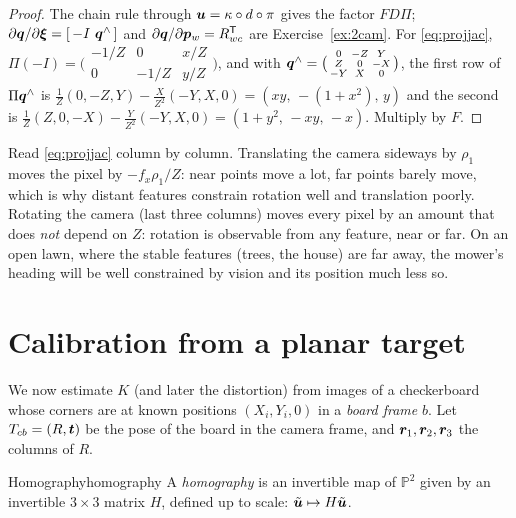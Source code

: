 \begin{proof}
The chain rule through $\bm{u}=\kappa\circ d\circ\pi$ gives the factor
$FD\Pi$; $\partial\vect{q}/\partial\bxi=[\,-I\ \hatop{\vect{q}}\,]$ and
$\partial\bm{q}/\partial\bm{p}_w=R_{wc}^{\mathsf{T}}$ are Exercise~\ref{ex:2cam}.
For \eqref{eq:projjac}, $\Pi(-I)=\bigl(\begin{smallmatrix}-1/Z&0&x/Z\\
0&-1/Z&y/Z\end{smallmatrix}\bigr)$, and with $\bm{q}^{\wedge}=
\bigl(\begin{smallmatrix}0&-Z&Y\\Z&0&-X\\-Y&X&0\end{smallmatrix}\bigr)$,
the first row of $\Pi\bm{q}^{\wedge}$ is
$\frac1Z(0,-Z,Y)-\frac{X}{Z^2}(-Y,X,0)=(xy,\,-(1+x^2),\,y)$ and the
second is $\frac1Z(Z,0,-X)-\frac{Y}{Z^2}(-Y,X,0)=(1+y^2,\,-xy,\,-x)$.
Multiply by $F$.
\end{proof}

\begin{inwords}
Read \eqref{eq:projjac} column by column. Translating the camera
sideways by $\rho_1$ moves the pixel by $-f_x\rho_1/Z$: near points move
a lot, far points barely move, which is why distant features constrain
rotation well and translation poorly. Rotating the camera (last three
columns) moves every pixel by an amount that does \emph{not} depend on
$Z$: rotation is observable from any feature, near or far. On an open
lawn, where the stable features (trees, the house) are far away, the
mower's heading will be well constrained by vision and its position much
less so.
\end{inwords}

\section{Calibration from a planar target}

We now estimate $K$ (and later the distortion) from images of a
checkerboard whose corners are at known positions $(X_i,Y_i,0)$ in a
\emph{board frame} $b$. Let $T_{cb}=(R,\bm{t})$ be the pose of the
board in the camera frame, and $\bm{r}_1,\bm{r}_2,\bm{r}_3$ the
columns of $R$.

\begin{definition}{Homography}{homography}
A \emph{homography} is an invertible map of $\mathbb{P}^2$ given by an
invertible $3\times3$ matrix $H$, defined up to scale:
$\tilde{\bm{u}}\mapsto H\tilde{\bm{u}}$.
\end{definition}

